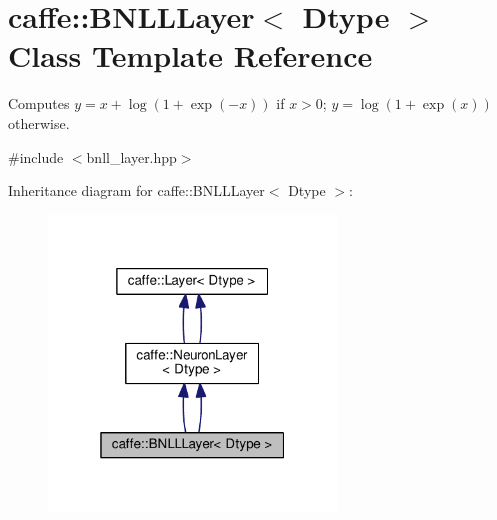\hypertarget{classcaffe_1_1_b_n_l_l_layer}{}\section{caffe\+:\+:B\+N\+L\+L\+Layer$<$ Dtype $>$ Class Template Reference}
\label{classcaffe_1_1_b_n_l_l_layer}


Computes $ y = x + \log(1 + \exp(-x)) $ if $ x > 0 $; $ y = \log(1 + \exp(x)) $ otherwise.  




{\ttfamily \#include $<$bnll\+\_\+layer.\+hpp$>$}



Inheritance diagram for caffe\+:\+:B\+N\+L\+L\+Layer$<$ Dtype $>$\+:
\nopagebreak
\begin{figure}[H]
\begin{center}
\leavevmode
\includegraphics[width=217pt]{classcaffe_1_1_b_n_l_l_layer__inherit__graph}
\end{center}
\end{figure}
